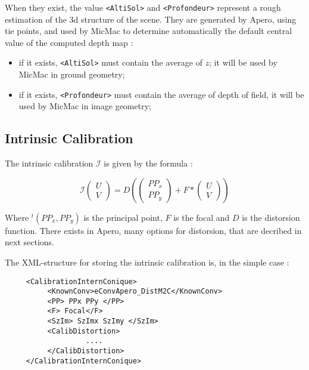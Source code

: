 When they exist, the value {\tt <AltiSol>} and {\tt <Profondeur>} represent a rough estimation of the
3d structure of the scene. They are generated by Apero, using tie points, and used by MicMac to determine automatically
the default central value of the computed depth map :


\begin{itemize}
   \item  if it exists, {\tt <AltiSol>} must contain the average of $z$;
         it will be used by MicMac in ground geometry;
   \item if it exists,  {\tt <Profondeur>} must contain the average of depth of field,
         it will be used by MicMac in image geometry;
\end{itemize}



\subsection{Intrinsic Calibration}

The intrinsic calibration  $ \mathcal{I} $ is given by the formula :

\begin{equation}
   \mathcal{I}\begin{pmatrix} U \\ V \end{pmatrix}
   = D\left(\begin{pmatrix} PP_x \\ PP_y \end{pmatrix}   + F* \begin{pmatrix} U \\ V \end{pmatrix}\right)
\end{equation}


Where $^t(PP_x,PP_y)$ is the principal point, $F$ is the focal and $D$ is the distorsion function.
There exists in Apero, many options for distorsion, that are decribed in next sections.

The XML-structure for storing the intrinsic calibration is, in the simple case :

\begin{verbatim}
     <CalibrationInternConique>
          <KnownConv>eConvApero_DistM2C</KnownConv>
          <PP> PPx PPy </PP>
          <F> Focal</F>
          <SzIm> SzImx SzImy </SzIm>
          <CalibDistortion>
                   ....
          </CalibDistortion>
     </CalibrationInternConique>
\end{verbatim}

